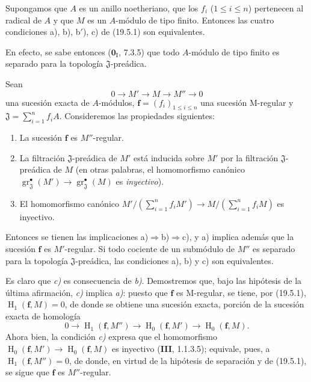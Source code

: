 \begin{corollary}[19.5.2]
\label{IV.19.5.2}
Supongamos que $A$ es un anillo noetheriano, que los $f_i$ \textup{($1\leq i\leq n$)} pertenecen al radical de $A$ y que $M$ es un $A$-módulo de tipo finito. Entonces las cuatro condiciones \textup{a), b), b$'$), c)} de \textup{(19.5.1)} son equivalentes.
\end{corollary}

En efecto, se sabe entonces ($\mathbf 0_{\mathrm I}$, 7.3.5) que todo $A$-módulo de tipo finito es separado para la topología $\mathfrak J$-preádica.

\begin{proposition}[19.5.3]
\label{IV.19.5.3}
Sean
\[
  0\longrightarrow M'\longrightarrow M\longrightarrow M''\longrightarrow0
\]
una sucesión exacta de $A$-módulos, $\mathbf f=(f_i)_{1\leq i\leq n}$ una sucesión M-regular y $\mathfrak J=\sum_{i=1}^n f_iA$. Consideremos las propiedades siguientes:
\begin{enumerate}
  \item[\textup{a)}] La sucesión $\mathbf f$ es $M''$-regular.
  \item[\textup{b)}] La filtración $\mathfrak J$-preádica de $M'$ está inducida sobre $M'$ por la filtración $\mathfrak J$-preádica de $M$ \textup{(en otras palabras, el homomorfismo canónico $\operatorname{gr}_{\mathfrak J}^\bullet(M')\to\operatorname{gr}_{\mathfrak J}^\bullet(M)$ es \emph{inyectivo})}.
  \item[\textup{c)}] El homomorfismo canónico $M'/(\sum_{i=1}^n f_iM')\to M/(\sum_{i=1}^n f_iM)$ es inyectivo.
\end{enumerate}
Entonces se tienen las implicaciones \textup{a)}$\Rightarrow$\textup{b)}$\Rightarrow$\textup{c)}, y \textup{a)} implica además que la sucesión $\mathbf f$ es $M'$-regular. Si todo cociente de un submódulo de $M''$ es separado para la topología $\mathfrak J$-preádica, las condiciones \textup{a)}, \textup{b)} y \textup{c)} son equivalentes.
\end{proposition}

Es claro que \emph{c)} es consecuencia de \emph{b)}. Demostremos que, bajo las hipótesis de la última afirmación, \emph{c)} implica \emph{a)}: puesto que $\mathbf f$ es M-regular, se tiene, por (19.5.1), $\operatorname{H}_1(\mathbf f,M)=0$, de donde se obtiene una sucesión exacta, porción de la sucesión exacta de homología
\[
  0\longrightarrow\operatorname{H}_1(\mathbf f,M'')\longrightarrow\operatorname{H}_0(\mathbf f,M')\longrightarrow\operatorname{H}_0(\mathbf f,M).
\]
Ahora bien, la condición \emph{c)} expresa que el homomorfismo $\operatorname{H}_0(\mathbf f,M')\to\operatorname{H}_0(\mathbf f,M)$ es inyectivo (\textbf{III}, 1.1.3.5); equivale, pues, a $\operatorname{H}_1(\mathbf f,M'')=0$, de donde, en virtud de la hipótesis de separación y de (19.5.1), se sigue que $\mathbf f$ es $M''$-regular.

